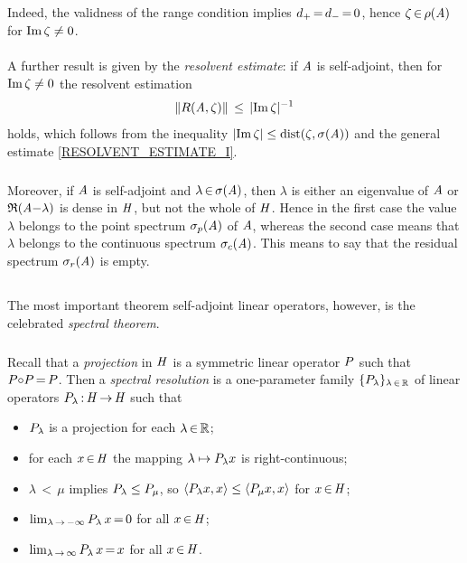 \documentclass[11pt,twoside]{article}
\begin{document}
\subparagraph{}
Indeed,
the validness of the range condition implies $d_+ {\,=\,} d_- {\,=\,} 0$,
hence $\zeta {\,\in\,} \rho(\mathit{A})$ for $\operatorname{Im} \zeta \neq 0$.

\paragraph{} %
A further result is given by the \textit{resolvent estimate}:
if $\mathit{A}$ is self-adjoint,
then for $\operatorname{Im} \zeta \neq 0$ the resolvent estimation
\[
\norm{R(\linA,\zeta)} \, \leq \, \abs{\im \zeta} ^{-1}
\]
holds,
which follows from the inequality 
$\abs{\im \zeta} \leq \mbox{dist}(\zeta,\sigma(\linA))$
and the general estimate \eqref{RESOLVENT_ESTIMATE_I}.

\subparagraph{} %
Moreover,
if $\mathit{A}$ is self-adjoint and $\lambda {\,\in\,} \sigma(\mathit{A})$,
then $\lambda$ is either an eigenvalue of $\mathit{A}$
or $\mathfrak{R}(\mathit{A} {-} \lambda)$ is dense in $\mathit{H}$,
but not the whole of $\mathit{H}$.
Hence in the first case the value $\lambda$
belongs to the {point spectrum} $\sigma_p(\mathit{A})$ of $\mathit{A}$,
whereas the second case means that
$\lambda$ belongs to the {continuous spectrum} $\sigma_c(\mathit{A})$.
This means to say that the {residual spectrum} $\sigma_r(\mathit{A})$ is empty.

\subsection{} %
The most important theorem {\wrt} self-adjoint linear operators,
however,
is the celebrated \textit{spectral theorem}.

\subparagraph{} %
Recall that a \textit{projection} in $\mathit{H}$ is a symmetric linear operator
${P}$ such that ${P} {\circ} {P} {\,=\,} {P}$.
Then a \textit{spectral resolution} is a one-parameter family
$\{{P}_{\lambda}\}_{\lambda {\,\in\,} {\mathbb{R}}}$
of linear operators ${P}_{\lambda} {\,:\,} \mathit{H} {\,\to\,} \mathit{H}$
such that

\begin{itemize}[leftmargin=12mm]
\item[(R-1)]
${P}_{\lambda}$ is a projection for each $\lambda {\,\in\,} {\mathbb{R}}$;
\item[(R-2)]
for each $x {\,\in\,} \mathit{H}$
the mapping $\lambda \mapsto {P}_{\lambda} x$ is right-continuous;
\item[(R-3)]
$\lambda {\,<\,} \mu$ implies ${P}_{\lambda} \leq {P}_{\mu}$,
so $\langle {P}_{\lambda} x,x \rangle \leq \langle {P}_{\mu} x,x \rangle$
for $x {\,\in\,} \mathit{H}$;
\item[(R-4)]
$\lim_{\lambda {\,\to\,} -\infty} {P}_{\lambda} \, x {\,=\,} 0$
for all $x {\,\in\,} \mathit{H}$;
\item[(R-5)]
$\lim_{\lambda {\,\to\,}  \infty} {P}_{\lambda} \, x {\,=\,} x$
for all $x {\,\in\,} \mathit{H}$.
\end{itemize}
\end{document}
